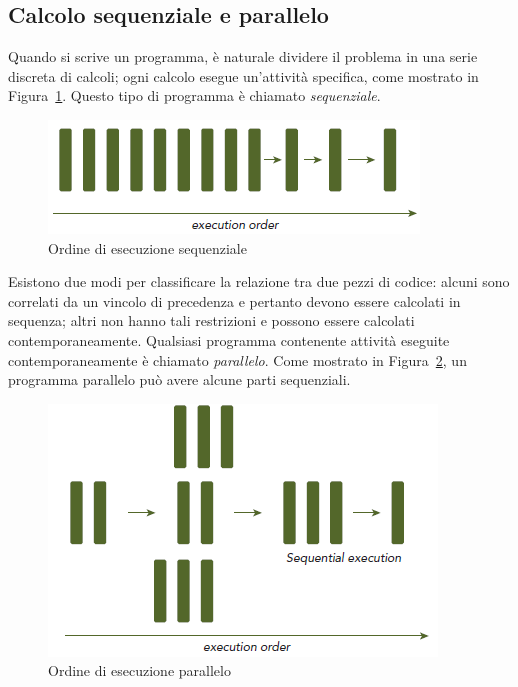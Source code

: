 \subsection{Calcolo sequenziale e parallelo}
Quando si scrive un programma, è naturale dividere il problema in una serie discreta di calcoli; ogni calcolo esegue un'attività specifica, come mostrato in Figura~\ref{fig:Execution_order_sequential}. Questo tipo di programma è chiamato \emph{sequenziale}.
\begin{figure}[h!]
	\centering
	\includegraphics[width=.5\textwidth]{Immagini/CUDA/Execution_order_sequential}
	\caption{Ordine di esecuzione sequenziale \cite{Cheng:ProfessionalCudaProgramming}}
	\label{fig:Execution_order_sequential}
\end{figure}
Esistono due modi per classificare la relazione tra due pezzi di codice: alcuni sono
correlati da un vincolo di precedenza e pertanto devono essere calcolati in sequenza; altri non hanno tali restrizioni e possono essere calcolati contemporaneamente. Qualsiasi programma contenente attività eseguite contemporaneamente è chiamato \emph{parallelo}. Come mostrato in Figura~\ref{fig:Execution_order_parallel}, un programma parallelo può avere alcune parti sequenziali.
\begin{figure}[H]
	\centering
	\includegraphics[width=.5\textwidth]{Immagini/CUDA/Execution_order_parallel}
	\caption{Ordine di esecuzione parallelo \cite{Cheng:ProfessionalCudaProgramming}}
	\label{fig:Execution_order_parallel}
\end{figure}
